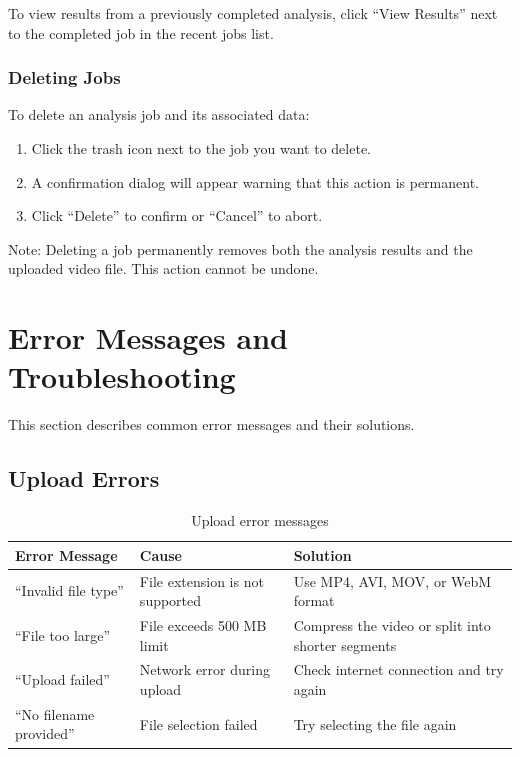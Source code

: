 To view results from a previously completed analysis, click ``View Results'' next to the completed job in the recent jobs list.

\subsubsection{Deleting Jobs}

To delete an analysis job and its associated data:

\begin{enumerate}
    \item Click the trash icon next to the job you want to delete.
    \item A confirmation dialog will appear warning that this action is permanent.
    \item Click ``Delete'' to confirm or ``Cancel'' to abort.
\end{enumerate}

Note: Deleting a job permanently removes both the analysis results and the uploaded video file. This action cannot be undone.

\section{Error Messages and Troubleshooting}
\label{sec:troubleshooting}

This section describes common error messages and their solutions.

\subsection{Upload Errors}

\begin{table}[H]
\centering
\small
\begin{tabular}{|p{4cm}|p{4cm}|p{4.5cm}|}
\hline
\textbf{Error Message} & \textbf{Cause} & \textbf{Solution} \\
\hline
``Invalid file type'' & File extension is not supported & Use MP4, AVI, MOV, or WebM format \\
\hline
``File too large'' & File exceeds 500 MB limit & Compress the video or split into shorter segments \\
\hline
``Upload failed'' & Network error during upload & Check internet connection and try again \\
\hline
``No filename provided'' & File selection failed & Try selecting the file again \\
\hline
\end{tabular}
\caption{Upload error messages}
\label{tab:upload-errors}
\end{table}

